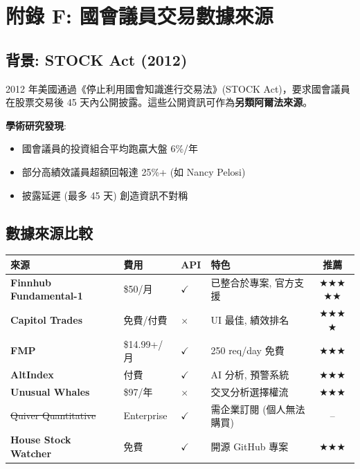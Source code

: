 \documentclass[11pt,a4paper]{article}
\newcommand{\cmark}{\textcolor{successgreen}{$\checkmark$}}
\newcommand{\xmark}{\textcolor{dangered}{$\times$}}
\newcommand{\starmark}{\textcolor{warningyellow}{$\bigstar$}}
\begin{document}
\newpage
\section*{附錄 F: 國會議員交易數據來源}

\subsection*{背景: STOCK Act (2012)}

2012 年美國通過《停止利用國會知識進行交易法》(STOCK Act)，要求國會議員在股票交易後 45 天內公開披露。這些公開資訊可作為\textbf{另類阿爾法來源}。

\textbf{學術研究發現}:
\begin{itemize}
    \item 國會議員的投資組合平均跑贏大盤 6\%/年
    \item 部分高績效議員超額回報達 25\%+ (如 Nancy Pelosi)
    \item 披露延遲 (最多 45 天) 創造資訊不對稱
\end{itemize}

\subsection*{數據來源比較}

\begin{table}[H]
\centering
\small
\begin{tabular}{@{}llllc@{}}
\toprule
\textbf{來源} & \textbf{費用} & \textbf{API} & \textbf{特色} & \textbf{推薦} \\
\midrule
\textbf{Finnhub Fundamental-1} & \$50/月 & \cmark & 已整合於專案, 官方支援 & \starmark\starmark\starmark\starmark\starmark \\
\textbf{Capitol Trades} & 免費/付費 & \xmark & UI 最佳, 績效排名 & \starmark\starmark\starmark\starmark \\
\textbf{FMP} & \$14.99+/月 & \cmark & 250 req/day 免費 & \starmark\starmark\starmark \\
\textbf{AltIndex} & 付費 & \cmark & AI 分析, 預警系統 & \starmark\starmark\starmark \\
\textbf{Unusual Whales} & \$97/年 & \xmark & 交叉分析選擇權流 & \starmark\starmark\starmark \\
\sout{Quiver Quantitative} & Enterprise & \cmark & 需企業訂閱 (個人無法購買) & -- \\
\textbf{House Stock Watcher} & 免費 & \cmark & 開源 GitHub 專案 & \starmark\starmark\starmark \\
\bottomrule
\end{tabular}
\end{table}
\end{document}
